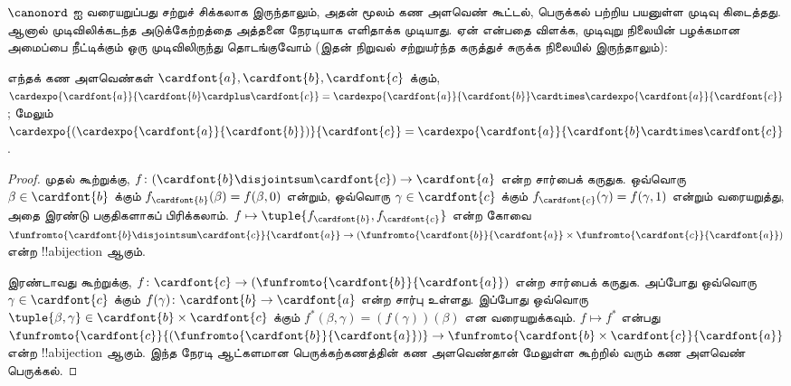 \documentclass[../../../include/open-logic-section]{subfiles}
\begin{document}

$\canonord$ ஐ வரையறுப்பது சற்றுச் சிக்கலாக இருந்தாலும், அதன் மூலம்
கண அளவெண் கூட்டல், பெருக்கல் பற்றிய பயனுள்ள
 முடிவு கிடைத்தது. ஆனால்
முடிவிலிக்கடந்த அடுக்கேற்றத்தை அத்தனை நேரடியாக எளிதாக்க முடியாது.
ஏன் என்பதை விளக்க, முடிவுறு நிலையின் பழக்கமான அமைப்பை நீட்டிக்கும்
ஒரு முடிவிலிருந்து தொடங்குவோம் (இதன் நிறுவல் சற்றுயர்ந்த
கருத்துச் சுருக்க நிலையில் இருந்தாலும்):

\begin{prop}
எந்தக் கண அளவெண்கள் $\cardfont{a}, \cardfont{b}, \cardfont{c}$
க்கும்,
$\cardexpo{\cardfont{a}}{\cardfont{b} \cardplus \cardfont{c}} =
\cardexpo{\cardfont{a}}{\cardfont{b}} \cardtimes
\cardexpo{\cardfont{a}}{\cardfont{c}}$; மேலும்
$\cardexpo{(\cardexpo{\cardfont{a}}{\cardfont{b}})}{\cardfont{c}} =
\cardexpo{\cardfont{a}}{\cardfont{b} \cardtimes \cardfont{c}}$.
\end{prop}

\begin{proof}
முதல் கூற்றுக்கு, $f \colon
(\cardfont{b}\disjointsum\cardfont{c}) \to \cardfont{a}$
என்ற சார்பைக் கருதுக. ஒவ்வொரு $\beta \in \cardfont{b}$ க்கும்
$f_\cardfont{b}(\beta) = f(\beta, 0)$ என்றும், ஒவ்வொரு
$\gamma \in \cardfont{c}$ க்கும்
$f_\cardfont{c}(\gamma) = f(\gamma, 1)$ என்றும் வரையறுத்து,
அதை இரண்டு பகுதிகளாகப் பிரிக்கலாம்.
$f \mapsto \tuple{f_{\cardfont{b}}, f_\cardfont{c}}$ என்ற
கோவை
$\funfromto{\cardfont{b} \disjointsum \cardfont{c}}{\cardfont{a}} \to
(\funfromto{\cardfont{b}}{\cardfont{a}} \times
\funfromto{\cardfont{c}}{\cardfont{a}})$
என்ற !!a{bijection} ஆகும்.

இரண்டாவது கூற்றுக்கு,
$f \colon \cardfont{c} \to
(\funfromto{\cardfont{b}}{\cardfont{a}})$ என்ற சார்பைக்
கருதுக. அப்போது ஒவ்வொரு $\gamma \in \cardfont{c}$ க்கும்
$f(\gamma) \colon \cardfont{b} \to \cardfont{a}$ என்ற சார்பு
உள்ளது. இப்போது ஒவ்வொரு
$\tuple{\beta, \gamma} \in \cardfont{b} \times \cardfont{c}$
க்கும் $f^*(\beta, \gamma) = (f(\gamma))(\beta)$ என வரையறுக்கவும்.
$f \mapsto f^*$ என்பது
$\funfromto{\cardfont{c}}{(\funfromto{\cardfont{b}}{\cardfont{a}})}
\to \funfromto{\cardfont{b} \times \cardfont{c}}{\cardfont{a}}$
என்ற !!a{bijection} ஆகும். இந்த நேரடி ஆட்களமான பெருக்கற்கணத்தின்
கண அளவெண்தான் மேலுள்ள கூற்றில் வரும் கண அளவெண் பெருக்கல்.
\end{proof}
\end{document}
